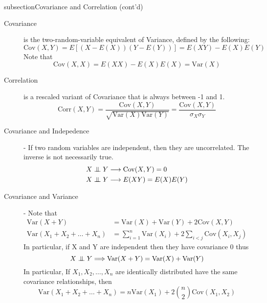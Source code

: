 \documentclass[10pt,landscape]{article}
\theoremstyle{definition}
\newcommand\independent{\protect\mathpalette{\protect\independenT}{\perp}}
\def\independenT#1#2{\mathrel{\setbox0\hbox{$#1#2$}%
    \copy0\kern-\wd0\mkern4mu\box0}}
\newcommand{\var}{\textrm{Var}}
\newcommand{\cov}{\textrm{Cov}}
\newcommand{\corr}{\textrm{Corr}}
\begin{document}
\begin{multicols}{3}
subsection{Covariance and Correlation (cont'd)}
\begin{description}
\item [Covariance] is the two-random-variable equivalent of Variance, defined by the following:
    \[\cov(X, Y) = E[(X - E(X))(Y - E(Y))] = E(XY) - E(X)E(Y)\]
    Note that 
    \[\cov(X, X) = E(XX) - E(X)E(X) =  \var(X)\]
\item [Correlation] is a rescaled variant of Covariance that is always between -1 and 1.
    \[\corr(X, Y) = \frac{\cov(X, Y)}{\sqrt{\var(X)\var(Y)}} = \frac{\cov(X, Y)}{\sigma_X\sigma_Y}\]
\item [Covariance and Indepedence] - If two random variables are independent, then they are uncorrelated. The inverse is not necessarily true. 
    \begin{align*}
    	X \independent Y &\longrightarrow \cov(X, Y) = 0 \\
    	X \independent Y &\longrightarrow E(XY) = E(X)E(Y)
    \end{align*}
\item [Covariance and Variance] - Note that
    \begin{align*}
        \var(X + Y) &= \var(X) + \var(Y) + 2\cov(X, Y) \\
        \var(X_1 + X_2 + \dots + X_n ) &= \sum_{i = 1}^{n}\var(X_i) + 2\sum_{i < j} \cov(X_i, X_j)
    \end{align*}
    In particular, if X and Y are independent then they have covariance 0 thus
    \[X \independent Y \Longrightarrow \var(X + Y) = \var(X) + \var(Y)\]
    In particular, If $X_1, X_2, \dots, X_n$ are identically distributed have the same covariance relationships, then 
    \[\var(X_1 + X_2 + \dots + X_n ) = n\var(X_1) + 2{n \choose 2}\cov(X_1, X_2)\]
    

\end{description}
\end{multicols}
\end{document}
